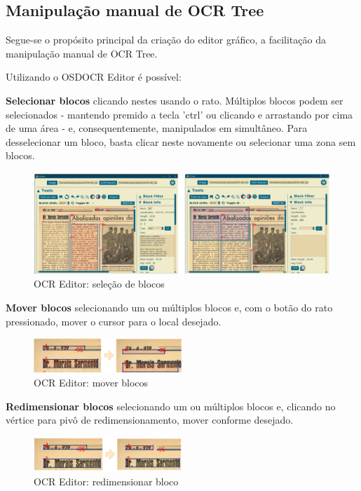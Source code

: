 \subsection{Manipulação manual de OCR Tree}

Segue-se o propósito principal da criação do editor gráfico, a facilitação da manipulação manual de OCR Tree.

Utilizando o OSDOCR Editor é possível:

\textbf{Selecionar blocos} clicando nestes usando o rato. Múltiplos blocos podem ser selecionados - mantendo premido a tecla 'ctrl' ou clicando e arrastando por cima de uma área -  e, consequentemente, manipulados em simultâneo. Para desselecionar um bloco, basta clicar neste novamente ou selecionar uma zona sem blocos.

\begin{figure}[H]
	\centering
	\includegraphics[width=1.1\textwidth]{images/ilustracoes/ocr_editor_select.png}
	\caption{OCR Editor: seleção de blocos}
	\label{fig:ocr_editor_select}
\end{figure}


\textbf{Mover blocos} selecionando um ou múltiplos blocos e, com o botão do rato pressionado, mover o cursor para o local desejado.

\begin{figure}[H]
	\centering
	\includegraphics[width=0.5\textwidth]{images/ilustracoes/ocr_editor_move.png}
	\caption{OCR Editor: mover blocos}
	\label{fig:ocr_editor_move}
\end{figure}


\textbf{Redimensionar blocos} selecionando um ou múltiplos blocos e, clicando no vértice para pivô de redimensionamento, mover conforme desejado.

\begin{figure}[H]
	\centering
	\includegraphics[width=0.5\textwidth]{images/ilustracoes/ocr_editor_resize.png}
	\caption{OCR Editor: redimensionar bloco}
	\label{fig:ocr_editor_resize}
\end{figure}

